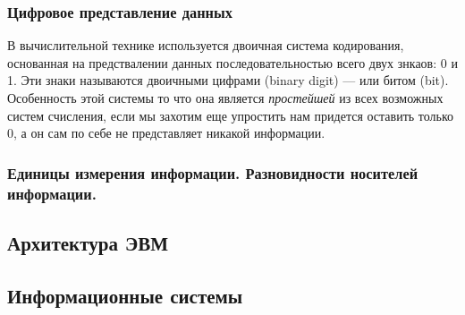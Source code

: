 \documentclass[a4paper]{article}
\begin{document}
\subsubsection{Цифровое представление данных}

В вычислительной технике используется двоичная система кодирования, основанная на предствалении данных последовательностью всего двух знкаов: 0 и 1. Эти знаки называются двоичными цифрами (binary digit) --- или битом (bit). Особенность этой системы то что она является \textit{простейшей} из всех возможных систем счисления, если мы захотим еще упростить нам придется оставить только 0, а он сам по себе не представляет никакой информации.

\subsubsection{Единицы измерения информации. Разновидности носителей информации.}





\subsection{Архитектура ЭВМ}

\subsection{Информационные системы}
\end{document}
